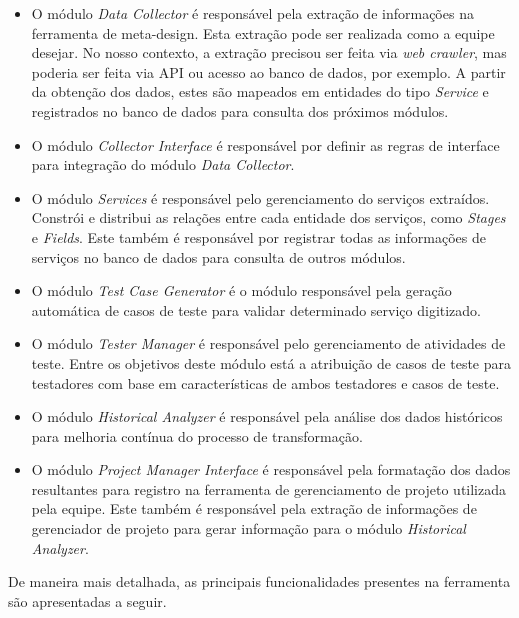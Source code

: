 \begin{itemize}
    \item O módulo \textit{Data Collector} é responsável pela extração de informações na ferramenta de meta-design. Esta extração pode ser realizada como a equipe desejar. No nosso contexto, a extração precisou ser feita via \textit{web crawler}, mas poderia ser feita via API ou acesso ao banco de dados, por exemplo. A partir da obtenção dos dados, estes são mapeados em entidades do tipo \textit{Service} e registrados no banco de dados para consulta dos próximos módulos. 
    
    \item O módulo \textit{Collector Interface} é responsável por definir as regras de interface para integração do módulo \textit{Data Collector}.
    
    \item O módulo \textit{Services} é responsável pelo gerenciamento do serviços extraídos. Constrói e distribui as relações entre cada entidade dos serviços, como \textit{Stages} e \textit{Fields}. Este também é responsável por registrar todas as informações de serviços no banco de dados para consulta de outros módulos.
    
    \item O módulo \textit{Test Case Generator} é o módulo responsável pela geração automática de casos de teste para validar determinado serviço digitizado.
    
    \item O módulo \textit{Tester Manager} é responsável pelo gerenciamento de atividades de teste. Entre os objetivos deste módulo está a atribuição de casos de teste para testadores com base em características de ambos testadores e casos de teste.
    
    \item O módulo \textit{Historical Analyzer} é responsável pela análise dos dados históricos para melhoria contínua do processo de transformação. 
    
    \item O módulo \textit{Project Manager Interface} é responsável pela formatação dos dados resultantes para registro na ferramenta de gerenciamento de projeto utilizada pela equipe. Este também é responsável pela extração de informações de gerenciador de projeto para gerar informação para o módulo \textit{Historical Analyzer}.
\end{itemize}

De maneira mais detalhada, as principais funcionalidades presentes na ferramenta são apresentadas a seguir.

